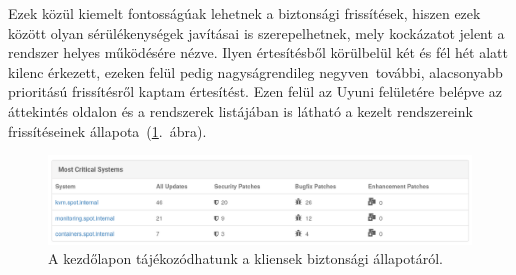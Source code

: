 Ezek közül kiemelt fontosságúak lehetnek a biztonsági frissítések, hiszen ezek között olyan sérülékenységek javításai is szerepelhetnek, mely kockázatot jelent a rendszer helyes működésére nézve. Ilyen értesítésből körülbelül két és fél hét alatt kilenc érkezett, ezeken felül pedig nagyságrendileg negyven~további, alacsonyabb prioritású frissítésről kaptam értesítést. Ezen felül az Uyuni felületére belépve az áttekintés oldalon és a rendszerek listájában is látható a kezelt rendszereink frissítéseinek állapota~(\ref{fig:uyuni-security-status}.~ábra).

\begin{figure}[ht]
	\centering
	\includegraphics[width=15cm]{figures/uyuni-security-status.png}
	\caption{A kezdőlapon tájékozódhatunk a kliensek biztonsági állapotáról.}
	\label{fig:uyuni-security-status}
\end{figure}